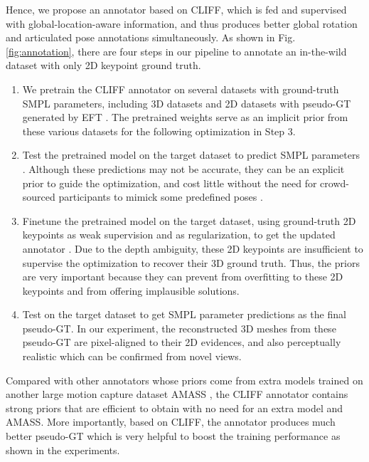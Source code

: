 \documentclass[runningheads]{llncs}
\begin{document}
Hence, we propose an annotator based on CLIFF, which is fed and supervised with global-location-aware information, and thus produces better global rotation and articulated pose annotations simultaneously.
As shown in Fig. \ref{fig:annotation}, there are four steps in our pipeline to annotate an in-the-wild dataset with only 2D keypoint ground truth.
\begin{enumerate}
\item We pretrain the CLIFF annotator  on several datasets with ground-truth SMPL parameters, including 3D datasets and 2D datasets with pseudo-GT generated by EFT \cite{joo2021exemplar}.
The pretrained weights serve as an implicit prior from these various datasets for the following optimization in Step 3.

\item Test the pretrained model  on the target dataset to predict SMPL parameters .
Although these predictions may not be accurate, they can be an explicit prior to guide the optimization, and cost little without the need for crowd-sourced participants to mimick some predefined poses \cite{muller2021self,kocabas2021spec}.

\item Finetune the pretrained model  on the target dataset, using ground-truth 2D keypoints as weak supervision and  as regularization, to get the updated annotator .
Due to the depth ambiguity, these 2D keypoints are insufficient to supervise the optimization to recover their 3D ground truth. Thus, the priors are very important because they can prevent  from overfitting to these 2D keypoints and from offering implausible solutions.

\item Test  on the target dataset to get SMPL parameter predictions  as the final pseudo-GT. In our experiment, the reconstructed 3D meshes from these pseudo-GT are pixel-aligned to their 2D evidences, and also perceptually realistic which can be confirmed from novel views.
\end{enumerate}

Compared with other annotators whose priors come from extra models \cite{bogo2016keep,pavlakos2019expressive} trained on another large motion capture dataset AMASS \cite{mahmood2019amass}, the CLIFF annotator contains strong priors that are efficient to obtain with no need for an extra model and AMASS.
More importantly, based on CLIFF, the annotator produces much better pseudo-GT which is very helpful to boost the training performance as shown in the experiments.
\end{document}
